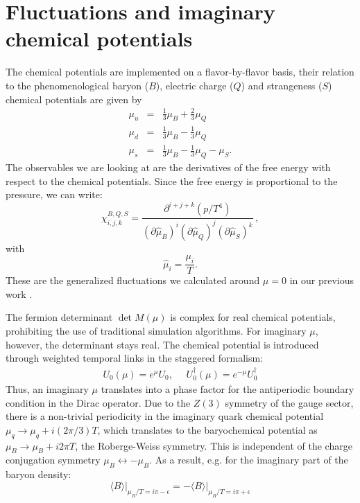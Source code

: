 \documentclass[a4paper,11pt]{article}
\begin{document}
\section{Fluctuations and imaginary chemical potentials\label{sec:immu}}

The chemical potentials are implemented on a flavor-by-flavor basis, their relation
to the phenomenological baryon ($B$), electric charge ($Q$) and strangeness ($S$) chemical
potentials are given by
\begin{eqnarray}
\mu_u&=&\frac13\mu_B+\frac23\mu_Q
\nonumber\\
\mu_d&=&\frac13\mu_B-\frac13\mu_Q
\nonumber\\
\mu_s&=&\frac13\mu_B-\frac13\mu_Q-\mu_S.
\label{eq:muBQS}
\end{eqnarray}
The observables we are looking at are the derivatives of the free energy with
respect to the chemical potentials. Since the free energy is proportional
to the pressure, we can write:
\begin{equation}
     \chi^{B,Q,S}_{i,j,k}= \frac{\partial^{i+j+k} (p/T^4)}{
(\partial \hat\mu_B)^i
(\partial \hat\mu_Q)^j
(\partial \hat\mu_S)^k
}\,,
\label{eq:chideriv}
\end{equation}
with
\begin{equation}
 \hat\mu_i=\frac{\mu_i}{T}.
\end{equation}
These are the generalized fluctuations we calculated around $\mu=0$ in our previous
work \cite{Bellwied:2015lba}.



The fermion determinant $\det M(\mu)$ is complex for real chemical potentials,
prohibiting the use of traditional simulation algorithms. For imaginary $\mu$,
however, the determinant stays real. The chemical potential is introduced through
weighted temporal links in the staggered formalism:
\begin{eqnarray}
U_0(\mu)=e^\mu U_0,~~~~~~
U_0^\dagger(\mu)=e^{-\mu} U_0^\dagger
\end{eqnarray}
Thus, an imaginary $\mu$ translates into a phase factor for the
antiperiodic boundary condition in the Dirac operator. Due to the $Z(3)$
symmetry of the gauge sector, there is a non-trivial periodicity in
the imaginary quark chemical potential $\mu_q \to \mu_q+i(2\pi/3)T$, which translates
to the baryochemical potential as $\mu_B \to \mu_B+i 2\pi T$, the
Roberge-Weiss symmetry. This is independent of the charge conjugation symmetry 
$\mu_B \leftrightarrow -\mu_B$. As a result, e.g. for the imaginary part of
the baryon density:
\begin{equation}
\left.\langle B\rangle\right|_{\mu_B/T=i\pi-\epsilon}=
-\left.\langle B\rangle\right|_{\mu_B/T=i\pi+\epsilon}
\label{eq:RWconj}
\end{equation}
\end{document}

